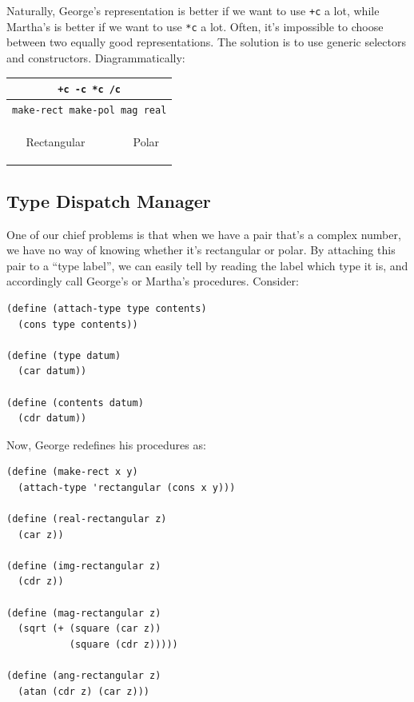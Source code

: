 \documentclass[9pt]{report}
\begin{document}
Naturally, George's representation is better if we want to use
\texttt{+c} a lot, while Martha's is better if we want to use \texttt{*c} a lot.
Often, it's impossible to choose between two equally good
representations. The solution is to use generic selectors and
constructors. Diagrammatically:

\begin{center}
\begin{tabular}[H]{|c|c|c|}
\hline
\multicolumn{3}{|c|}{\texttt{+c -c *c /c}}\\
\hline
\multicolumn{3}{|c|}{\texttt{make-rect make-pol mag real}}\\
\hline
&  &\\
&  &\\
&  &\\
Rectangular &  & Polar\\
&  &\\
&  &\\
&  &\\
\hline
\end{tabular}
\end{center}


\subsection{Type Dispatch Manager}
\label{sec:org9240b31}

One of our chief problems is that when we have a pair that's a
complex number, we have no way of knowing whether it's rectangular
or polar. By attaching this pair to a ``type label'', we can easily
tell by reading the label which type it is, and accordingly call
George's or Martha's procedures. Consider:

\begin{verbatim}
(define (attach-type type contents)
  (cons type contents))

(define (type datum)
  (car datum))

(define (contents datum)
  (cdr datum))
\end{verbatim}

Now, George redefines his procedures as:

\begin{verbatim}
(define (make-rect x y)
  (attach-type 'rectangular (cons x y)))

(define (real-rectangular z)
  (car z))

(define (img-rectangular z)
  (cdr z))

(define (mag-rectangular z)
  (sqrt (+ (square (car z))
           (square (cdr z)))))

(define (ang-rectangular z)
  (atan (cdr z) (car z)))
\end{verbatim}
\end{document}
